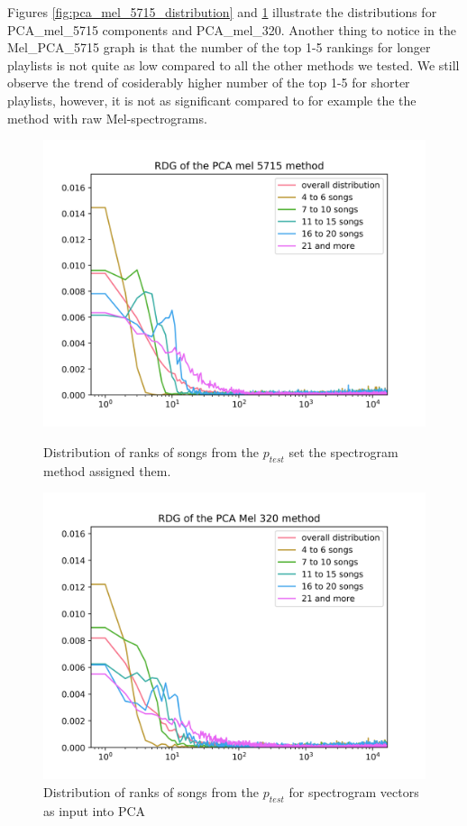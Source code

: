 Figures \ref{fig:pca_mel_5715_distribution} and \ref{fig:pca_mel_320_distribution} illustrate the distributions for PCA\_mel\_5715 components and PCA\_mel\_320. Another thing to notice in the Mel\_PCA\_{5715} graph is that the number of the top 1-5 rankings for longer playlists is not quite as low compared to all the other methods we tested. We still observe the trend of cosiderably higher number of the top 1-5 for shorter playlists, however, it is not as significant compared to for example the the method with raw Mel-spectrograms.
\begin{figure}[h]
\centering
\begin{minipage}{.45\textwidth}
  \centering
  \includegraphics[width=1\linewidth]{./img/pca_mel_5715_graph.png}
  \caption{Distribution of ranks of songs from the $p_{test}$ set the spectrogram method assigned them.}
  \label{fig:pca_mel_5715_distribution}
\end{minipage}%
\begin{minipage}{.45\textwidth}
  \centering
  \includegraphics[width=1\linewidth]{./img/pca_mel_320_graph.png}
  \caption{Distribution of ranks of songs from the $p_{test}$ for spectrogram vectors as input into PCA}
  \label{fig:pca_mel_320_distribution}
\end{minipage}
\end{figure}\label{fig:pca_mel_comparison_graps}

